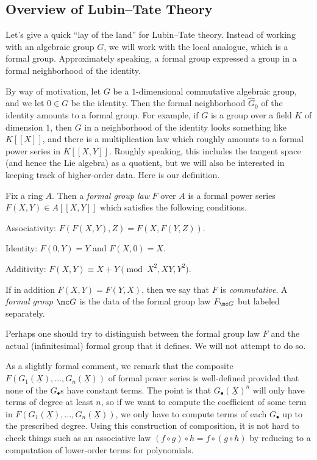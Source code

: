 \documentclass[../notes.tex]{subfiles}
\begin{document}
\subsection{Overview of Lubin--Tate Theory}
Let's give a quick ``lay of the land'' for Lubin--Tate theory. Instead of working with an algebraic group $G$, we will work with the local analogue, which is a formal group. Approximately speaking, a formal group expressed a group in a formal neighborhood of the identity.

By way of motivation, let $G$ be a $1$-dimensional commutative algebraic group, and we let $0\in G$ be the identity. Then the formal neighborhood $\widehat G_0$ of the identity amounts to a formal group. For example, if $G$ is a group over a field $K$ of dimension $1$, then $G$ in a neighborhood of the identity looks something like $K[[X]]$, and there is a multiplication law which roughly amounts to a formal power series in $K[[X,Y]]$. Roughly speaking, this includes the tangent space (and hence the Lie algebra) as a quotient, but we will also be interested in keeping track of higher-order data. Here is our definition.
\begin{definition}
	Fix a ring $A$. Then a \textit{formal group law} $F$ over $A$ is a formal power series $F(X,Y)\in A[[X,Y]]$ which satisfies the following conditions.
	\begin{listalph}
		\item Associativity: $F(F(X,Y),Z)=F(X,F(Y,Z))$.
		\item Identity: $F(0,Y)=Y$ and $F(X,0)=X$.
		\item Additivity: $F(X,Y)\equiv X+Y\pmod{X^2,XY,Y^2}$.
	\end{listalph}
	If in addition $F(X,Y)=F(Y,X)$, then we say that $F$ is \textit{commutative}. A \textit{formal group} $\mc G$ is the data of the formal group law $F_{\mc G}$ but labeled separately.
\end{definition}
\begin{remark}
	Perhaps one should try to distinguish between the formal group law $F$ and the actual (infinitesimal) formal group that it defines. We will not attempt to do so.
\end{remark}
\begin{remark}
	As a slightly formal comment, we remark that the composite $F(G_1(\underline X),\ldots,G_n(\underline X))$ of formal power series is well-defined provided that none of the $G_\bullet$s have constant terms. The point is that $G_\bullet(\underline X)^n$ will only have terms of degree at least $n$, so if we want to compute the coefficient of some term in $F(G_1(\underline X),\ldots,G_n(\underline X))$, we only have to compute terms of each $G_\bullet$ up to the prescribed degree. Using this construction of composition, it is not hard to check things such as an associative law $(f\circ g)\circ h=f\circ(g\circ h)$ by reducing to a computation of lower-order terms for polynomials.
\end{remark}
\end{document}
